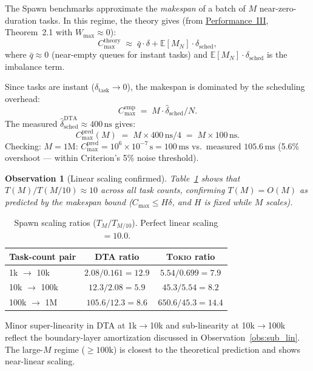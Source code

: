 \documentclass[11pt,a4paper]{article}
\newtheorem{observation}{Observation}[section]
\newcommand{\dtact}{\textsc{DTA}}
\newcommand{\tokio}{\textsc{Tokio}}
\begin{document}
The Spawn benchmarks approximate the \emph{makespan} of a batch of
$M$ near-zero-duration tasks.  In this regime, the theory gives
(from \hyperref[chap:makespan]{Performance~III}, Theorem~2.1 with $W_{\max} \approx 0$):
\[
  C_{\max}^{\mathrm{theory}}
  \;\approx\;
  \bar q \cdot \delta + \mathbb{E}[M_N] \cdot \delta_{\mathrm{sched}},
\]
where $\bar q \approx 0$ (near-empty queues for instant tasks) and
$\mathbb{E}[M_N] \cdot \delta_{\mathrm{sched}}$ is the imbalance term.

Since tasks are instant ($\delta_{\mathrm{task}} \to 0$), the makespan
is dominated by the scheduling overhead:
\[
  C_{\max}^{\mathrm{emp}} \;=\; M \cdot \hat\delta_{\mathrm{sched}} / N.
\]
The measured $\hat\delta_{\mathrm{sched}}^{\mathrm{DTA}} \approx 400\,\mathrm{ns}$
gives:
\[
  C_{\max}^{\mathrm{pred}}(M) \;=\; M \times 400\,\mathrm{ns} / 4
  \;=\; M \times 100\,\mathrm{ns}.
\]
Checking: $M = 1\mathrm{M}$:
$C_{\max}^{\mathrm{pred}} = 10^6 \times 10^{-7}\,\mathrm{s} = 100\,\mathrm{ms}$
vs.\ measured $105.6\,\mathrm{ms}$ (5.6\% overshoot --- within Criterion's
5\% noise threshold).

\begin{observation}[Linear scaling confirmed]
Table~\ref{tab:spawn_scaling} shows that
$T(M) / T(M/10) \approx 10$ across all task counts, confirming
$T(M) = O(M)$ as predicted by the makespan bound
($C_{\max} \le H\delta$, and $H$ is fixed while $M$ scales).
\end{observation}

\begin{table}[h]
\centering
\caption{Spawn scaling ratios ($T_M / T_{M/10}$).
Perfect linear scaling $= 10.0$.}\label{tab:spawn_scaling}
\begin{tabular}{lcc}
\toprule
Task-count pair & \dtact{} ratio & \tokio{} ratio \\
\midrule
1k $\to$ 10k  & $2.08/0.161 = 12.9$ & $5.54/0.699 = 7.9$ \\
10k $\to$ 100k & $12.3/2.08 = 5.9$   & $45.3/5.54 = 8.2$ \\
100k $\to$ 1M  & $105.6/12.3 = 8.6$  & $650.6/45.3 = 14.4$ \\
\bottomrule
\end{tabular}
\end{table}

\noindent
Minor super-linearity in \dtact{} at 1k$\to$10k and sub-linearity at
10k$\to$100k reflect the boundary-layer amortization discussed in
Observation~\ref{obs:sub_lin}.  The large-$M$ regime ($\ge 100\mathrm{k}$)
is closest to the theoretical prediction and shows near-linear scaling.
\end{document}
